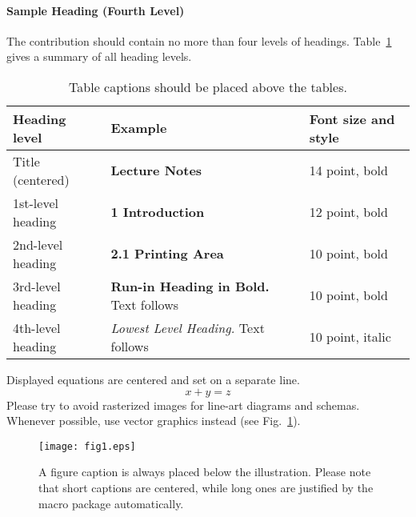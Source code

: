 \documentclass[runningheads]{llncs}
\begin{document}
\paragraph{Sample Heading (Fourth Level)}
The contribution should contain no more than four levels of
headings. Table~\ref{tab1} gives a summary of all heading levels.

\begin{table}
\caption{Table captions should be placed above the
tables.}\label{tab1}
\begin{tabular}{|l|l|l|}
\hline
Heading level &  Example & Font size and style\\
\hline
Title (centered) &  {\Large\bfseries Lecture Notes} & 14 point, bold\\
1st-level heading &  {\large\bfseries 1 Introduction} & 12 point, bold\\
2nd-level heading & {\bfseries 2.1 Printing Area} & 10 point, bold\\
3rd-level heading & {\bfseries Run-in Heading in Bold.} Text follows & 10 point, bold\\
4th-level heading & {\itshape Lowest Level Heading.} Text follows & 10 point, italic\\
\hline
\end{tabular}
\end{table}


\noindent Displayed equations are centered and set on a separate
line.
\begin{equation}
x + y = z
\end{equation}
Please try to avoid rasterized images for line-art diagrams and
schemas. Whenever possible, use vector graphics instead (see
Fig.~\ref{fig1}).

\begin{figure}
\texttt{[image: fig1.eps]}
\caption{A figure caption is always placed below the illustration.
Please note that short captions are centered, while long ones are
justified by the macro package automatically.} \label{fig1}
\end{figure}
\end{document}
